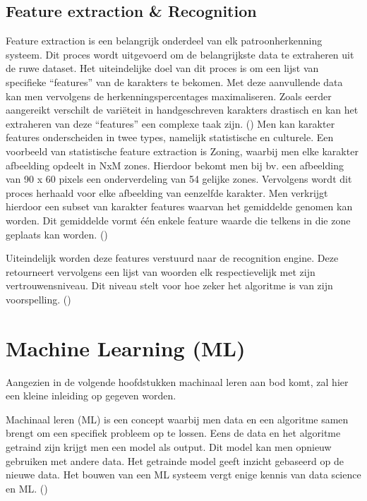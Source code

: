 \subsection{Feature extraction \& Recognition}
Feature extraction is een belangrijk onderdeel van elk patroonherkenning systeem. Dit proces wordt uitgevoerd om de belangrijkste data te extraheren uit de ruwe dataset. Het uiteindelijke doel van dit proces is om een lijst van specifieke “features” van de karakters te bekomen. Met deze aanvullende data kan men vervolgens de herkenningspercentages maximaliseren. Zoals eerder aangereikt verschilt de variëteit in handgeschreven karakters drastisch en kan het extraheren van deze “features” een complexe taak zijn. (\cite{VijayLaxmiSahu2012}) \newline  \newline Men kan karakter features onderscheiden in twee types, namelijk statistische en culturele. Een voorbeeld van statistische feature extraction is Zoning, waarbij men elke karakter afbeelding opdeelt in NxM zones. Hierdoor bekomt men bij bv. een afbeelding van 90 x 60 pixels een onderverdeling van 54 gelijke zones. Vervolgens wordt dit proces herhaald voor elke afbeelding van eenzelfde karakter. Men verkrijgt hierdoor een subset van karakter features waarvan het gemiddelde genomen kan worden. Dit gemiddelde vormt één enkele feature waarde die telkens in die zone geplaats kan worden. (\cite{VijayLaxmiSahu2012})  

Uiteindelijk worden deze features verstuurd naar de recognition engine. Deze retourneert vervolgens een lijst van woorden elk respectievelijk met zijn vertrouwensniveau. Dit niveau stelt voor hoe zeker het algoritme is van zijn voorspelling. (\cite{GergelyTimar2003})

\section{Machine Learning (ML)}
Aangezien in de volgende hoofdstukken machinaal leren aan bod komt, zal hier een kleine inleiding op gegeven worden. 

Machinaal leren (ML) is een concept waarbij men data en een algoritme samen brengt om een specifiek probleem op te lossen. Eens de data en het algoritme getraind zijn krijgt men een model als output. Dit model kan men opnieuw gebruiken met andere data. Het getrainde model geeft inzicht gebaseerd op de nieuwe data. Het bouwen van een ML systeem vergt enige kennis van data science en ML. (\cite{Microsoft2020e})



